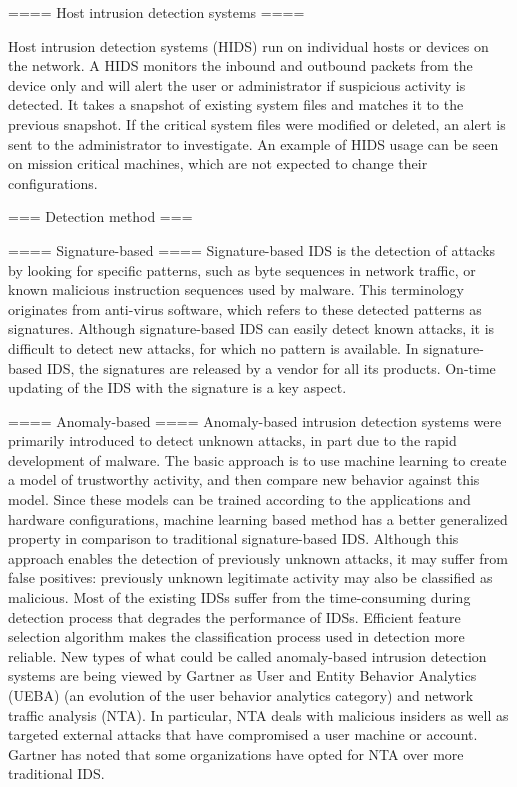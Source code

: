 ==== Host intrusion detection systems ====

Host intrusion detection systems (HIDS) run on individual hosts or devices on the network. A HIDS monitors the inbound and outbound packets from the device only and will alert the user or administrator if suspicious activity is detected. It takes a snapshot of existing system files and matches it to the previous snapshot. If the critical system files were modified or deleted, an alert is sent to the administrator to investigate. An example of HIDS usage can be seen on mission critical machines, which are not expected to change their configurations.


=== Detection method ===


==== Signature-based ====
Signature-based IDS is the detection of attacks by looking for specific patterns, such as byte sequences in network traffic, or known malicious instruction sequences used by malware. This terminology originates from anti-virus software, which refers to these detected patterns as signatures. Although signature-based IDS can easily detect known attacks, it is difficult to detect new attacks, for which no pattern is available.
In signature-based IDS, the signatures are released by a vendor for all its products. On-time updating of the IDS with the signature is a key aspect.


==== Anomaly-based ====
Anomaly-based intrusion detection systems were primarily introduced to detect unknown attacks, in part due to the rapid development of malware. The basic approach is to use machine learning to create a model of trustworthy activity, and then compare new behavior against this model. Since these models can be trained according to the applications and hardware configurations, machine learning based method has a better generalized property in comparison to traditional signature-based IDS. Although this approach enables the detection of previously unknown attacks, it may suffer from false positives: previously unknown legitimate activity may also be classified as malicious. Most of the existing IDSs suffer from the time-consuming during detection process that degrades the performance of IDSs. Efficient feature selection algorithm makes the classification process used in detection more reliable.
New types of what could be called anomaly-based intrusion detection systems are being viewed by Gartner as User and Entity Behavior Analytics (UEBA) (an evolution of the user behavior analytics category) and network traffic analysis (NTA). In particular, NTA deals with malicious insiders as well as targeted external attacks that have compromised a user machine or account. Gartner has noted that some organizations have opted for NTA over more traditional IDS.


